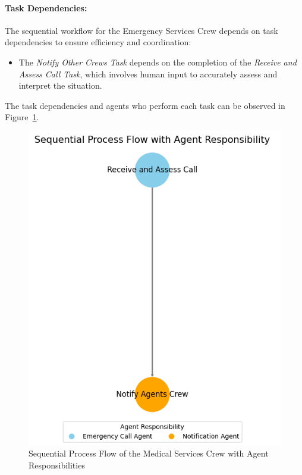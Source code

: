 \paragraph{Task Dependencies:}

The sequential workflow for the Emergency Services Crew depends on task dependencies to ensure efficiency and coordination:
\begin{itemize}
    \item The \textit{Notify Other Crews Task} depends on the completion of the \textit{Receive and Assess Call Task}, which 
    involves human input to accurately assess and interpret the situation.
\end{itemize}


The task dependencies and agents who perform each task can be observed in Figure~\ref{fig:emergency_services_flow}.

\begin{figure}[h!]
	\centering
	\includegraphics[height=0.4\textheight]{figures/emergency_services_crew_flow.png}
	\caption{Sequential Process Flow of the Medical Services Crew with Agent Responsibilities}
	\label{fig:emergency_services_flow}
\end{figure}
